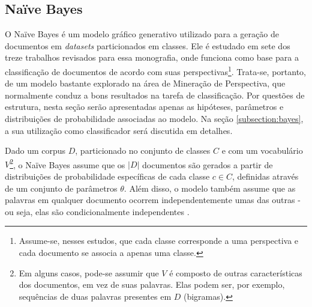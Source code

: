 

\subsection{Naïve Bayes}
\label{subsection:naive}

O Naïve Bayes é um modelo gráfico generativo utilizado para a geração de documentos em \emph{datasets} particionados em classes. Ele é estudado em sete dos treze trabalhos revisados para essa monografia, onde funciona como base para a classificação de documentos de acordo com suas perspectivas\footnote{Assume-se, nesses estudos, que cada classe corresponde a uma perspectiva e cada documento se associa a apenas uma classe.}. Trata-se, portanto, de um modelo bastante explorado na área de Mineração de Perspectiva, que normalmente conduz a bons resultados na tarefa de classificação. Por questões de estrutura, nesta seção serão apresentadas apenas as hipóteses, parâmetros e distribuições de probabilidade associadas ao modelo. Na seção \ref{subsection:bayes}, a sua utilização como classificador será discutida em detalhes.


Dado um corpus \ensuremath{D}, particionado no conjunto de classes \ensuremath{C} e com um vocabulário \ensuremath{V}\footnote{Em alguns casos, pode-se assumir que \ensuremath{V} é composto de outras características dos documentos, em vez de suas palavras. Elas podem ser, por exemplo, sequências de duas palavras presentes em \ensuremath{D} (bigramas).}, o Naïve Bayes assume que os \ensuremath{|D|} documentos são gerados a partir de distribuições de probabilidade específicas de cada classe \ensuremath{c \in C}, definidas através de um conjunto de parâmetros \ensuremath{\theta}. Além disso, o modelo também assume que as palavras em qualquer documento ocorrem independentemente umas das outras - ou seja, elas são condicionalmente independentes \cite{nigam}. %


